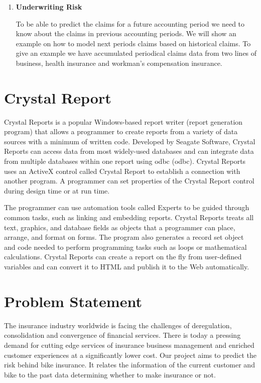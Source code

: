 \begin{enumerate}
\item \textbf{Underwriting Risk}
\par
To be able to predict the claims for a future accounting period we need to know about the claims in previous accounting periods. We will show an example on how to model next periods claims based on historical claims. To give an example we have accumulated periodical claims data from two lines of business, health insurance and workman’s compensation insurance.

\end{enumerate}

\section{Crystal Report}
Crystal Reports is a popular Windows-based report writer (report generation program) that allows a programmer to create reports from a variety of data sources with a minimum of written code. Developed by Seagate Software, Crystal Reports can access data from most widely-used databases and can integrate data from multiple databases within one report using \acl{odbc} (\acs{odbc}). Crystal Reports uses an ActiveX control called Crystal Report to establish a connection with another program. A programmer can set properties of the Crystal Report control during design time or at run time.
\par
The programmer can use automation tools called Experts to be guided through common tasks, such as linking and embedding reports. Crystal Reports treats all text, graphics, and database fields as objects that a programmer can place, arrange, and format on forms. The program also generates a record set object and code needed to perform programming tasks such as loops or mathematical calculations. Crystal Reports can create a report on the fly from user-defined variables and can convert it to HTML and publish it to the Web automatically. 

\section{Problem Statement}
The insurance industry worldwide is facing the challenges of deregulation, consolidation and convergence of financial services. There is today a pressing demand for cutting edge services of insurance business management and enriched customer experiences at a significantly lower cost. Our project aims to predict the risk behind bike insurance. It relates the information of the current customer and bike to the past data determining whether to make insurance or not.


